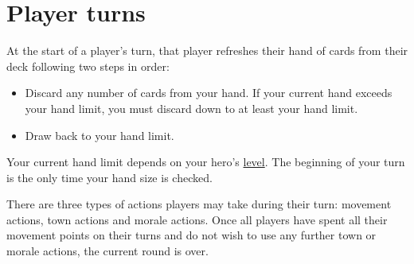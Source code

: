 \documentclass[12pt]{article}
\begin{document}
\clearpage

\section{Player turns}
At the start of a player’s turn, that player refreshes their hand of cards from their deck following two steps in order:
\begin{itemize}
    \item Discard any number of cards from your hand. If your current hand exceeds your hand limit, you must discard down to at least your hand limit.
    \item Draw back to your hand limit.
\end{itemize}
Your current hand limit depends on your hero’s \hyperlink{Level}{level}. The beginning of your turn is the only time your hand size is checked.\par
There are three types of actions players may take during their turn: movement actions, town actions and morale actions. Once all players have spent all their movement points on their turns and do not wish to use any further town or morale actions, the current round is over.
\end{document}
